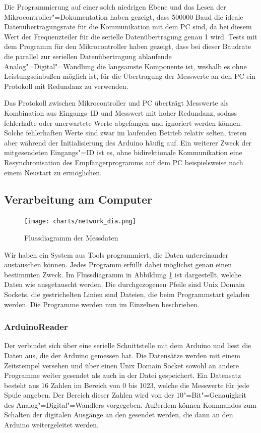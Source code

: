 Die Programmierung auf einer solch niedrigen Ebene und das Lesen der Mikrocontroller"=Dokumentation
haben gezeigt, dass 500000 Baud die ideale Datenübertragungsrate für die Kommunikation mit dem PC
sind, da bei diesem Wert der Frequenzteiler für die serielle Datenübertragung genau 1 wird.
Tests mit dem Programm für den Mikrocontroller haben gezeigt, dass bei
dieser Baudrate die
parallel zur seriellen Datenübertragung ablaufende Analog"=Digital"=Wandlung die langsamste
Komponente ist, weshalb es ohne Leistungseinbußen möglich ist, für die Übertragung
der Messwerte an den PC ein Protokoll mit Redundanz zu verwenden.

Das Protokoll zwischen Mikrocontroller und PC überträgt Messwerte als Kombination aus
Eingangs--ID und Messwert mit hoher Redundanz, sodass fehlerhafte oder
unerwartete Werte abgefangen und
ignoriert werden können. Solche fehlerhaften Werte sind zwar im laufenden Betrieb relativ selten,
treten aber während der Initialisierung des Arduino häufig auf. Ein weiterer Zweck der
mitgesendeten Eingangs"=ID ist es, ohne bidirektionale Kommunikation eine Resynchronisation des
Empfängerprogramms auf dem PC beispielsweise nach einem Neustart zu ermöglichen.

\subsection{Verarbeitung am Computer}

\begin{figure}
  \centering
  \texttt{[image: charts/network\_dia.png]}
  \caption{Flussdiagramm der Messdaten}
  \label{fig:network}
\end{figure}

Wir haben ein System aus Tools programmiert, die Daten untereinander austauschen können. Jedes Programm erfüllt dabei möglichst genau einen bestimmten Zweck.
Im Flussdiagramm in Abbildung \ref{fig:network} ist dargestellt, welche Daten wie ausgetauscht werden.
Die durchgezogenen Pfeile sind Unix Domain Sockets, die gestrichelten Linien sind Dateien, die beim Programmstart geladen werden.
Die Programme werden nun im Einzelnen beschrieben.

\subsubsection{ArduinoReader}

Der  verbindet sich über eine serielle Schnittstelle mit dem Arduino und liest die Daten aus, die der Arduino gemessen hat.
Die Datensätze werden mit einem Zeitstempel versehen und über einen Unix Domain Socket sowohl an andere Programme weiter gesendet als auch in der Datei  gespeichert.
Ein Datensatz besteht aus 16 Zahlen im Bereich von 0 bis 1023, welche die Messwerte für jede Spule angeben.
Der Bereich dieser Zahlen wird von der 10"=Bit"=Genauigkeit des Analog"=Digital"=Wandlers vorgegeben.
Außerdem können Kommandos zum Schalten der digitalen Ausgänge an den  gesendet werden, die dann an den Arduino weitergeleitet werden.

